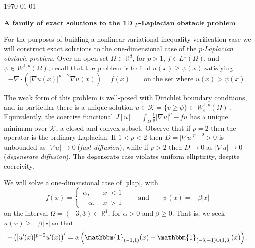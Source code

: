\documentclass[11pt]{amsart}
\newcommand{\Div}{\ensuremath{\nabla\cdot}}
\newcommand{\grad}{\nabla}
\newcommand{\RR}{\mathbb{R}}
\begin{document}
\scriptsize \hfill \today

\Large
\bigskip
\centerline{\textbf{A family of exact solutions to the 1D $p$-Laplacian obstacle problem}}
\bigskip

\normalsize

\thispagestyle{empty}

For the purposes of building a nonlinear variational inequality verification case we will construct exact solutions to the one-dimensional case of the \emph{$p$-Laplacian obstacle problem}.  Over an open set $\Omega\subset \RR^d$, for $p>1$, $f \in L^1(\Omega)$, and $\psi \in W^{1,p}(\Omega)$, recall that the problem is to find $u(x) \ge \psi(x)$ satisfying
\begin{equation}
-\Div\left(|\grad u(x)|^{p-2} \grad u(x)\right) = f(x) \qquad \text{on the set where } u(x) > \psi(x). \label{plap}
\end{equation}

The weak form of this problem is well-posed with Dirichlet boundary conditions, and in particular there is a unique solution $u \in \mathcal{K}=\{v \ge \psi\} \subset W_0^{1,p}(\Omega)$ \cite{KinderlehrerStampacchia1980}.  Equivalently, the coercive functional $J[u] = \int_\Omega \frac{1}{p} |\grad u|^p - f u$ has a unique minimum over $\mathcal{K}$, a closed and convex subset.  Observe that if $p=2$ then the operator is the ordinary Laplacian.  If $1<p<2$ then $D=|\grad u|^{p-2}>0$ is unbounded as $|\grad u| \to 0$ (\emph{fast diffusion}), while if $p>2$ then $D\to 0$ as $|\grad u| \to 0$ (\emph{degenerate diffusion}).  The degenerate case violates uniform ellipticity, despite coercivity.

We will solve a one-dimensional case of \eqref{plap}, with
\begin{equation}
f(x) = \begin{cases} \alpha, & |x| < 1 \\ -\alpha, & |x| > 1\end{cases} \qquad \text{and} \qquad \psi(x) = - \beta |x| \label{data}
\end{equation}
on the interval $\Omega = (-3,3) \subset \RR^1$, for $\alpha > 0$ and $\beta \ge 0$.
That is, we seek $u(x) \ge -\beta |x|$ so that
\begin{equation}
-\left(|u'(x)|^{p-2} u'(x)\right)' = \alpha \left(\mathbbm{1}_{(-1,1)}(x) - \mathbbm{1}_{(-3,-1)\cup(1,3)}(x)\right).  \label{concrete}
\end{equation}
\end{document}
